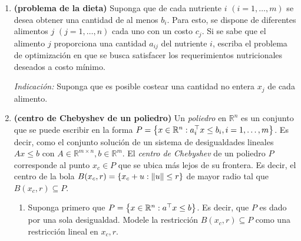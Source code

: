 \documentclass{article}
\begin{document}
\begin{enumerate}
	\item \textbf{(problema de la dieta)} Suponga que de cada nutriente \(i\) \((i = 1, \dots, m)\) se desea obtener una cantidad de al menos \(b_i\). Para esto, se dispone de diferentes alimentos \(j\) \((j = 1, \dots, n)\) cada uno con un costo \(c_j\). Si se sabe que el alimento \(j\) proporciona una cantidad \(a_{ij}\) del nutriente \(i\), escriba el problema de optimización en que se busca satisfacer los requerimientos nutricionales deseados a costo mínimo.

		\textit{Indicación:} Suponga que es posible costear una cantidad no entera \(x_j\) de cada alimento.
	\item \textbf{(centro de Chebyshev de un poliedro)} Un \textit{poliedro} en \(\mathbb{R}^n\) es un conjunto que se puede escribir en la forma \(P = \qty{x \in \mathbb{R}^n : a_i^\top x \leq b_i, i =1, \dots, m}\). Es decir, como el conjunto solución de un sistema de desigualdades lineales \(Ax \leq b\) con \(A \in \mathbb{R}^{m  \times n}, b \in \mathbb{R}^m\). El \textit{centro de Chebyshev} de un poliedro \(P\) corresponde al punto \(x_c \in P\) que se ubica más lejos de su frontera. Es decir, el centro de la bola \(B(x_c, r) = \qty{x_c + u : \norm{u} \leq r}\) de mayor radio tal que \(B(x_c, r) \subseteq P\).
	\begin{enumerate}
		\item Suponga primero que \(P = \qty{x \in \mathbb{R}^n : a^\top x \leq b}\). Es decir, que \(P\) es dado por una sola desigualdad. Modele la restricción \(B(x_c, r) \subseteq P\) como una restricción lineal en \(x_c, r\).
			

\end{enumerate}
\end{enumerate}
\end{document}
